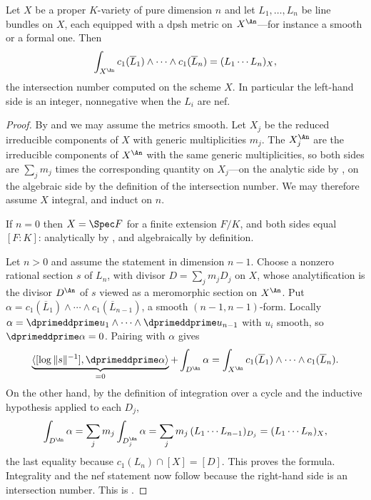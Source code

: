 \begin{theorem}
\label{thm:ch17-degree}
Let $X$ be a proper $K$-variety of pure dimension $n$ and let
$L_1,\dots,L_n$ be line bundles on $X$, each equipped with a dpsh metric
on $X^{\An}$---for instance a smooth or a formal one.  Then
\[
 \int_{X^{\An}}c_1(\overline L_1)\wedge\cdots\wedge c_1(\overline L_n)
 =(L_1\cdots L_n)_X,
\]
the intersection number computed on the scheme $X$.  In particular the
left-hand side is an integer, nonnegative when the $L_i$ are nef.
\end{theorem}

\begin{proof}
By  and
 we may assume the metrics smooth.  Let
$X_j$ be the reduced irreducible components of $X$ with generic
multiplicities $m_j$.  The $X_j^{\An}$ are the irreducible components of
$X^{\An}$ with the same generic multiplicities, so both sides are
$\sum_jm_j$ times the corresponding quantity on $X_j$---on the analytic
side by , on the algebraic side by the
definition of the intersection number.  We may therefore assume $X$
integral, and induct on $n$.

If $n=0$ then $X=\Spec F$ for a finite extension $F/K$, and both sides
equal $[F:K]$: analytically by , and
algebraically by definition.

Let $n>0$ and assume the statement in dimension $n-1$.  Choose a nonzero
rational section $s$ of $L_n$, with divisor $D=\sum_jm_jD_j$ on $X$,
whose analytification is the divisor $D^{\An}$ of $s$ viewed as a
meromorphic section on $X^{\An}$.  Put
$\alpha=c_1(\overline L_1)\wedge\cdots\wedge c_1(\overline L_{n-1})$, a
smooth $(n-1,n-1)$-form.  Locally $\alpha=\dprimeddprime u_1\wedge\cdots
\wedge\dprimeddprime u_{n-1}$ with $u_i$ smooth, so
$\dprimeddprime\alpha=0$.  Pairing
 with $\alpha$ gives
\[
 \underbrace{\langle[\log\|s\|^{-1}],\dprimeddprime\alpha\rangle}_{=0}
 +\int_{D^{\An}}\alpha
 =\int_{X^{\An}}c_1(\overline L_1)\wedge\cdots\wedge c_1(\overline L_n).
\]
On the other hand, by the definition of integration over a cycle and the
inductive hypothesis applied to each $D_j$,
\[
 \int_{D^{\An}}\alpha
 =\sum_jm_j\int_{D_j^{\An}}\alpha
 =\sum_jm_j\,(L_1\cdots L_{n-1})_{D_j}
 =(L_1\cdots L_n)_X,
\]
the last equality because $c_1(L_n)\cap[X]=[D]$.  This proves the formula.
Integrality and the nef statement now follow because the right-hand side is
an intersection number.  This is \cite[Theorem~18.3.11]{CLD25}.
\end{proof}

